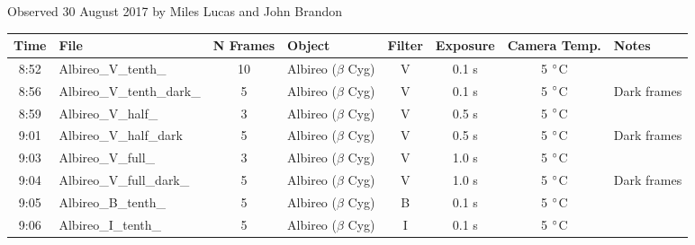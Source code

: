 \caption{Observed 30 August 2017 by Miles Lucas and John Brandon}
\begin{tabular}{clclcccl}
	\hline
	Time & File  & N Frames  & Object & Filter & Exposure & Camera Temp. & Notes \\
	\hline\hline
	8:52 & Albireo\_V\_tenth\_       & 10       & Albireo ($\beta$ Cyg) & V      & 0.1 s    & 5 $\degree$C &             \\
	8:56 & Albireo\_V\_tenth\_dark\_ & 5        & Albireo ($\beta$ Cyg) & V      & 0.1 s    & 5 $\degree$C & Dark frames \\
	8:59 & Albireo\_V\_half\_        & 3        & Albireo ($\beta$ Cyg) & V      & 0.5 s    & 5 $\degree$C &             \\
	9:01 & Albireo\_V\_half\_dark    & 5        & Albireo ($\beta$ Cyg) & V      & 0.5 s    & 5 $\degree$C & Dark frames \\
	9:03 & Albireo\_V\_full\_        & 3        & Albireo ($\beta$ Cyg) & V      & 1.0 s    & 5 $\degree$C &             \\
	9:04 & Albireo\_V\_full\_dark\_  & 5        & Albireo ($\beta$ Cyg) & V      & 1.0 s    & 5 $\degree$C & Dark frames \\
	9:05 & Albireo\_B\_tenth\_       & 5        & Albireo ($\beta$ Cyg) & B      & 0.1 s    & 5 $\degree$C &             \\
	9:06 & Albireo\_I\_tenth\_       & 5        & Albireo ($\beta$ Cyg) & I      & 0.1 s    & 5 $\degree$C &             \\
	\hline
\end{tabular}